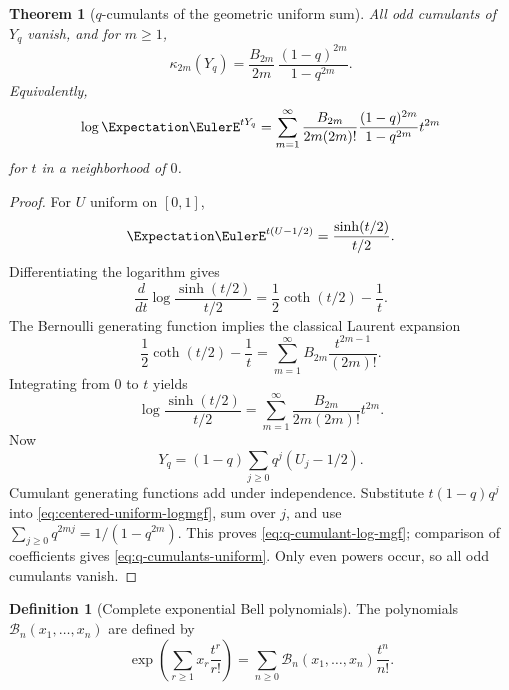 \documentclass[11pt,a4paper,oneside,openany]{book}
\newtheorem{theorem}{Theorem}[chapter]
\theoremstyle{definition}
\newtheorem{definition}[definition]{Definition}
\theoremstyle{remark}
\begin{document}
\begin{theorem}[$q$-cumulants of the geometric uniform sum]\label{thm:q-cumulants-uniform}
All odd cumulants of $Y_q$ vanish, and for $m\ge1$,
\begin{equation}\label{eq:q-cumulants-uniform}
 \kappa_{2m}(Y_q)
 =\frac{B_{2m}}{2m}\,
   \frac{(1-q)^{2m}}{1-q^{2m}}.
\end{equation}
Equivalently,
\begin{equation}\label{eq:q-cumulant-log-mgf}
 \log\Expectation \EulerE^{tY_q}
 =\sum_{m=1}^{\infty}
   \frac{B_{2m}}{2m(2m)!}
   \frac{(1-q)^{2m}}{1-q^{2m}}t^{2m}
\end{equation}
for $t$ in a neighborhood of $0$.
\end{theorem}

\begin{proof}
For $U$ uniform on $[0,1]$,
\[
 \Expectation \EulerE^{t(U-1/2)}
 =\frac{\sinh(t/2)}{t/2}.
\]
Differentiating the logarithm gives
\[
 \frac{d}{dt}\log\frac{\sinh(t/2)}{t/2}
 =\frac12\coth(t/2)-\frac1t.
\]
The Bernoulli generating function implies the classical Laurent expansion
\[
 \frac12\coth(t/2)-\frac1t
 =\sum_{m=1}^{\infty}B_{2m}\frac{t^{2m-1}}{(2m)!}.
\]
Integrating from $0$ to $t$ yields
\begin{equation}\label{eq:centered-uniform-logmgf}
 \log\frac{\sinh(t/2)}{t/2}
 =\sum_{m=1}^{\infty}
   \frac{B_{2m}}{2m(2m)!}t^{2m}.
\end{equation}
Now
\[
 Y_q=(1-q)\sum_{j\ge0}q^j(U_j-1/2).
\]
Cumulant generating functions add under independence.  Substitute
$t(1-q)q^j$ into \eqref{eq:centered-uniform-logmgf}, sum over $j$, and use
$\sum_{j\ge0}q^{2mj}=1/(1-q^{2m})$.  This proves
\eqref{eq:q-cumulant-log-mgf}; comparison of coefficients gives
\eqref{eq:q-cumulants-uniform}.  Only even powers occur, so all odd cumulants vanish.
\end{proof}

\begin{definition}[Complete exponential Bell polynomials]
The polynomials $\mathcal B_n(x_1,\ldots,x_n)$ are defined by
\begin{equation}\label{eq:complete-bell-definition}
 \exp\!\left(\sum_{r\ge1}x_r\frac{t^r}{r!}\right)
 =\sum_{n\ge0}\mathcal B_n(x_1,\ldots,x_n)\frac{t^n}{n!}.
\end{equation}
\end{definition}
\end{document}
